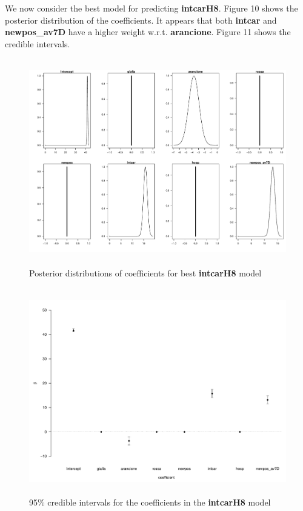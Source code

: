 \documentclass[12pt,a4paper]{article}
\theoremstyle{definition}
\theoremstyle{remark}
\begin{document}
We now consider the best model for predicting \textbf{intcarH8}. Figure 10 shows the posterior distribution of the coefficients. It appears that both \textbf{intcar} and \textbf{newpos\_av7D} have a higher weight w.r.t. \textbf{arancione}. Figure 11 shows the credible intervals.

\begin{figure}[htb!]
	\centering
	\includegraphics[width=140mm, height=90mm,scale=0.5]{posterior_2.pdf}
	\caption{Posterior distributions of coefficients for best \textbf{intcarH8} model}
\end{figure}

\begin{figure}[htb!]
	\centering
	\includegraphics[width=140mm, height=90mm,scale=0.5]{crint2.pdf}
	\caption{95\% credible intervals for the coefficients in the \textbf{intcarH8} model}
\end{figure}
\end{document}
